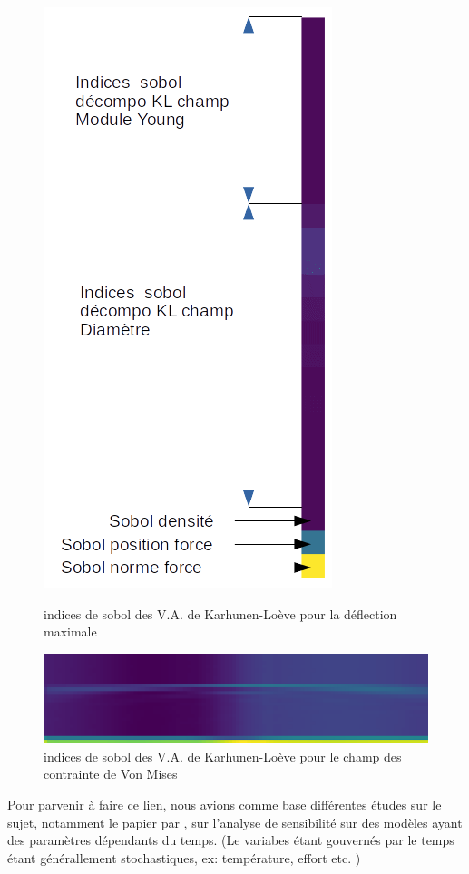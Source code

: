 \documentclass[a4paper,10pt]{article}
\begin{document}
\begin{figure}[H]
    \centering
    \begin{minipage}{0.45\textwidth}
        \centering
        \includegraphics[height=1\textwidth]{sensitivity_rv_KL_anno.png} %
        \caption{indices de sobol des V.A. de Karhunen-Loève pour la déflection maximale}
    \end{minipage}\hfill
    \begin{minipage}{0.45\textwidth}
        \centering
        \includegraphics[width=1.35\textwidth]{sensitivity_field_KL.png} %
        \caption{indices de sobol des V.A. de Karhunen-Loève pour le champ des contrainte de Von Mises}
    \end{minipage}
\end{figure}

Pour parvenir à faire ce lien, nous avions comme base différentes études sur le sujet, notamment le papier par \cite{Wei2017May}, sur l'analyse de sensibilité sur des modèles ayant des paramètres dépendants du temps. (Le variabes étant gouvernés par le temps étant générallement stochastiques, ex: température, effort etc. )
\end{document}
